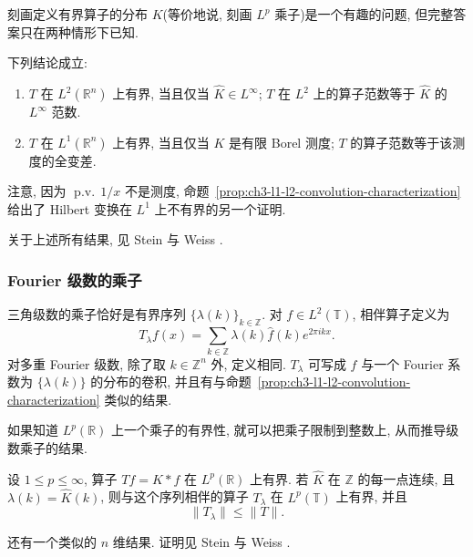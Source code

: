 刻画定义有界算子的分布 $K$(等价地说, 刻画 $L^p$ 乘子)是一个有趣的问题, 但完整答案只在两种情形下已知.

\begin{Proposition}
\label{prop:ch3-l1-l2-convolution-characterization}
下列结论成立:

\begin{enumerate}
\item $T$ 在 $L^2(\mathbb R^n)$ 上有界, 当且仅当 $\widehat K\in L^\infty$; $T$ 在 $L^2$ 上的算子范数等于 $\widehat K$ 的 $L^\infty$ 范数.
\item $T$ 在 $L^1(\mathbb R^n)$ 上有界, 当且仅当 $K$ 是有限 Borel 测度; $T$ 的算子范数等于该测度的全变差.
\end{enumerate}
\end{Proposition}

注意, 因为 $\operatorname{p.v.}\,1/x$ 不是测度, 命题~\ref{prop:ch3-l1-l2-convolution-characterization} 给出了 Hilbert 变换在 $L^1$ 上不有界的另一个证明.

关于上述所有结果, 见 Stein 与 Weiss .

\subsubsection{Fourier 级数的乘子}
\label{subsec:ch3-fourier-series-multipliers}

三角级数的乘子恰好是有界序列 $\{\lambda(k)\}_{k\in\mathbb Z}$. 对 $f\in L^2(\mathbb T)$, 相伴算子定义为
\[
 T_\lambda f(x)=\sum_{k\in\mathbb Z}\lambda(k)\widehat f(k)e^{2\pi ikx}.
\]
对多重 Fourier 级数, 除了取 $k\in\mathbb Z^n$ 外, 定义相同. $T_\lambda$ 可写成 $f$ 与一个 Fourier 系数为 $\{\lambda(k)\}$ 的分布的卷积, 并且有与命题~\ref{prop:ch3-l1-l2-convolution-characterization} 类似的结果.

如果知道 $L^p(\mathbb R)$ 上一个乘子的有界性, 就可以把乘子限制到整数上, 从而推导级数乘子的结果.

\begin{Theorem}
\label{thm:ch3-multiplier-restriction-to-integers}
设 $1\le p\le\infty$, 算子 $Tf=K*f$ 在 $L^p(\mathbb R)$ 上有界. 若 $\widehat K$ 在 $\mathbb Z$ 的每一点连续, 且 $\lambda(k)=\widehat K(k)$, 则与这个序列相伴的算子 $T_\lambda$ 在 $L^p(\mathbb T)$ 上有界, 并且
\[
 \|T_\lambda\|\le\|T\|.
\]
\end{Theorem}

还有一个类似的 $n$ 维结果. 证明见 Stein 与 Weiss .

